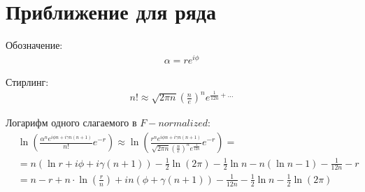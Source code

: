 \documentclass[a4paper, 12pt]{article}
\author{Нугманов Булат}
\begin{document}
\section*{Приближение для ряда}
Обозначение:
\begin{equation}
\begin{aligned}
    \alpha = r e^{i\phi}
\end{aligned}
\end{equation}

Стирлинг:
\begin{equation}
\begin{aligned}
    n! \approx \sqrt{2\pi n} \left(\frac{n}{e}\right)^n e^{\frac{1}{12n}+\dots}
\end{aligned}
\end{equation}

Логарифм одного слагаемого в $F-normalized$:
\begin{equation}
\begin{aligned}
    &\ln\left(\frac{\alpha^n e^{i\phi n + i\gamma n(n+1)}}{n!}e^{-r}\right)  \approx 
    \ln\left(\frac{r^n e^{i\phi n + i\gamma n(n+1)}}{\sqrt{2\pi n} \left(\frac{n}{e}\right)^n e^{\frac{1}{12n}}}e^{-r}\right) =\\
    &=n \left(\ln r + i \phi + i \gamma (n+1)\right) - \frac{1}{2}\ln\left(2\pi\right) 
    - \frac{1}{2}\ln n - n \left(\ln n - 1\right) - \frac{1}{12n} - r\\
    &=n-r + n\cdot\ln\left(\frac{r}{n}\right) + i n \left(\phi + \gamma(n+1)\right)
     -  \frac{1}{12n} - \frac{1}{2}\ln n - \frac{1}{2}\ln\left(2\pi\right) 
\end{aligned}
\end{equation}
\end{document}
